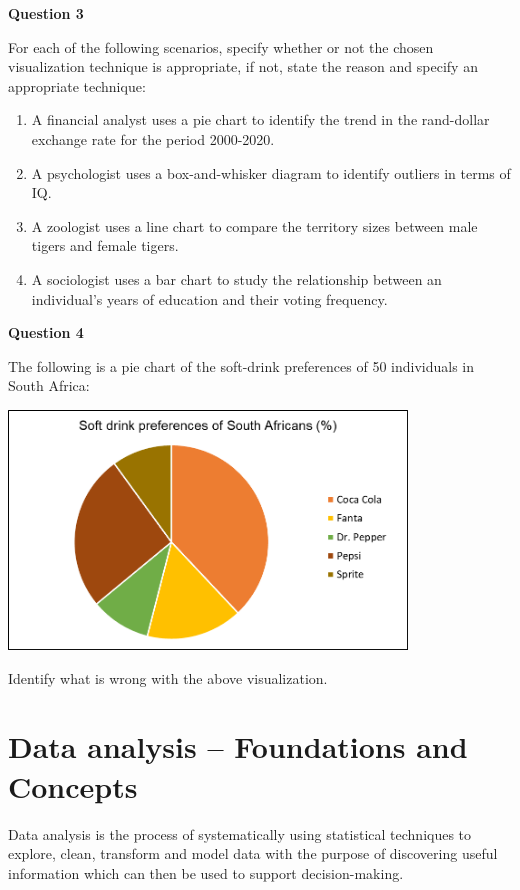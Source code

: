 \documentclass[
]{book}
\begin{document}
\textbf{Question 3}

For each of the following scenarios, specify whether or not the chosen visualization technique is appropriate, if not, state the reason and specify an appropriate technique:

\begin{enumerate}
\def\labelenumi{\alph{enumi}.}
\item
  A financial analyst uses a pie chart to identify the trend in the rand-dollar exchange rate for the period 2000-2020.
\item
  A psychologist uses a box-and-whisker diagram to identify outliers in terms of IQ.
\item
  A zoologist uses a line chart to compare the territory sizes between male tigers and female tigers.
\item
  A sociologist uses a bar chart to study the relationship between an individual's years of education and their voting frequency.
\end{enumerate}

\textbf{Question 4}

The following is a pie chart of the soft-drink preferences of 50 individuals in South Africa:

\includegraphics[width=4.16667in,height=\textheight]{images/clipboard-2887671888.png}

Identify what is wrong with the above visualization.

\newpage

\section{Data analysis -- Foundations and Concepts}\label{sec1-7}

Data analysis is the process of systematically using statistical techniques to explore, clean, transform and model data with the purpose of discovering useful information which can then be used to support decision-making.
\end{document}
